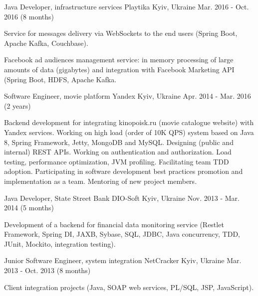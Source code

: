 \begin{cventries}
  \cventry
    {Java Developer, infrastructure services} %
    {Playtika} %
    {Kyiv, Ukraine} %
    {Mar. 2016 - Oct. 2016 (8 months)} %
    {
      \begin{cvitems} %
        \item {Service for messages delivery via WebSockets to the end users (Spring Boot, Apache Kafka, Couchbase).}
        \item {Facebook ad audiences management service: in memory processing of large amounts of data (gigabytes) and integration with Facebook Marketing API (Spring Boot, HDFS, Apache Kafka.}
      \end{cvitems}
    }

  \cventry
    {Software Engineer, movie platform} %
    {Yandex} %
    {Kyiv, Ukraine} %
    {Apr. 2014 - Mar. 2016 (2 years)} %
    {
      \begin{cvitems} %
        \item {Backend development for integrating kinopoisk.ru (movie catalogue website) with Yandex services. Working on high load (order of 10K QPS) system based on Java 8, Spring Framework, Jetty, MongoDB and MySQL. Designing (public and internal) REST APIs. Working on authentication and authorization. Load testing, performance optimization, JVM profiling. Facilitating team TDD adoption. Participating in software development best practices promotion and implementation as a team. Mentoring of new project members.}
      \end{cvitems}
    }

  \cventry
    {Java Developer, State Street Bank} %
    {DIO-Soft} %
    {Kyiv, Ukraine} %
    {Nov. 2013 - Mar. 2014 (5 months)} %
    {
      \begin{cvitems} %
        \item {Development of a backend for financial data monitoring service (Restlet Framework, Spring DI, JAXB, Sybase, SQL, JDBC, Java concurrency, TDD, JUnit, Mockito, integration testing).}
      \end{cvitems}
    }

  \cventry
    {Junior Software Engineer, system integration} %
    {NetCracker} %
    {Kyiv, Ukraine} %
    {Mar. 2013 - Oct. 2013 (8 months)} %
    {
      \begin{cvitems} %
        \item {Client integration projects (Java, SOAP web services, PL/SQL, JSP, JavaScript).}
      \end{cvitems}
    }


\end{cventries}
